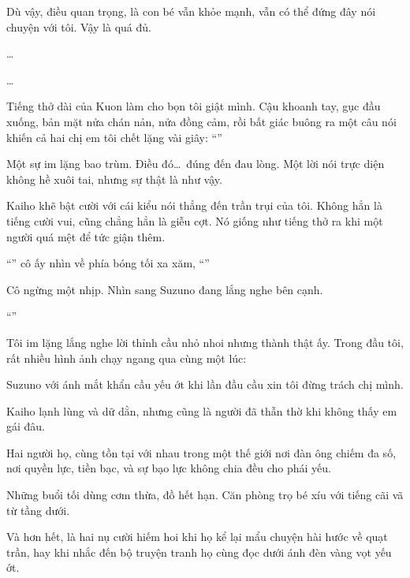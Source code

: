 \documentclass[../main.tex]{subfiles}
\begin{document}
Dù vậy, điều quan trọng, là con bé vẫn khỏe mạnh, vẫn có thể đứng đây nói chuyện với tôi. Vậy là quá đủ.

\dots

\dots

Tiếng thở dài của Kuon làm cho bọn tôi giật mình. Cậu khoanh tay, gục đầu xuống, bản mặt nửa chán nản, nửa đồng cảm, rồi bất giác buông ra một câu nói khiến cả hai chị em tôi chết lặng vài giây: ``''

Một sự im lặng bao trùm. Điều đó\dots\ đúng đến đau lòng. Một lời nói trực diện không hề xuôi tai, nhưng sự thật là như vậy.


Kaiho khẽ bật cười với cái kiểu nói thẳng đến trần trụi của tôi. Không hẳn là tiếng cười vui, cũng chẳng hẳn là giễu cợt. Nó giống như tiếng thở ra khi một người quá mệt để tức giận thêm.

``'' cô ấy nhìn về phía bóng tối xa xăm, ``''

Cô ngừng một nhịp. Nhìn sang Suzuno đang lắng nghe bên cạnh.

``''

Tôi im lặng lắng nghe lời thỉnh cầu nhỏ nhoi nhưng thành thật ấy. Trong đầu tôi, rất nhiều hình ảnh chạy ngang qua cùng một lúc:

Suzuno với ánh mắt khẩn cầu yếu ớt khi lần đầu cầu xin tôi đừng trách chị mình.

Kaiho lạnh lùng và dữ dằn, nhưng cũng là người đã thẫn thờ khi không thấy em gái đâu.

Hai người họ, cùng tồn tại với nhau trong một thế giới nơi đàn ông chiếm đa số, nơi quyền lực, tiền bạc, và sự bạo lực không chia đều cho phái yếu.

Những buổi tối dùng cơm thừa, đồ hết hạn. Căn phòng trọ bé xíu với tiếng cãi vã từ tầng dưới.

Và hơn hết, là hai nụ cười hiếm hoi khi họ kể lại mẩu chuyện hài hước về quạt trần, hay khi nhắc đến bộ truyện tranh họ cùng đọc dưới ánh đèn vàng vọt yếu ớt.
\end{document}
